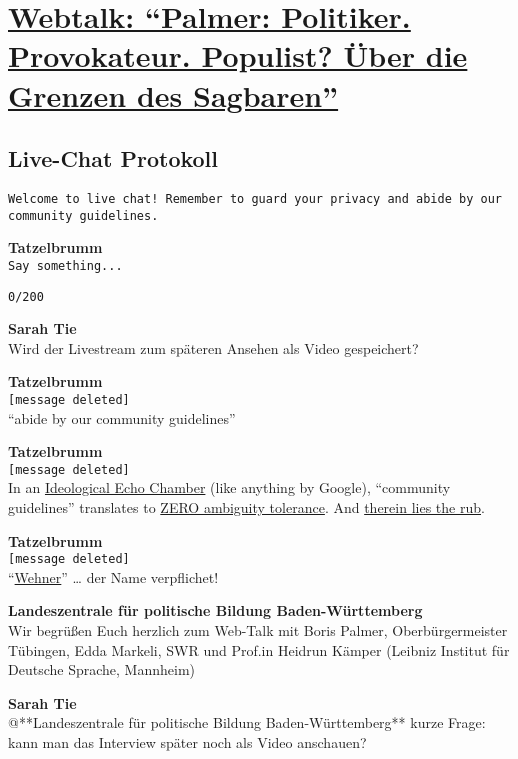\documentclass[]{article}
\date{}
\begin{document}
\section{\texorpdfstring{\protect\hyperlink{Webtalk}{Webtalk: ``Palmer:
Politiker. Provokateur. Populist? Über die Grenzen des
Sagbaren''}}{Webtalk: Palmer: Politiker. Provokateur. Populist? Über die Grenzen des Sagbaren}}\label{webtalk-palmer-politiker.-provokateur.-populist-uxfcber-die-grenzen-des-sagbaren}

\subsection{Live-Chat Protokoll}\label{live-chat-protokoll}

\texttt{Welcome\ to\ live\ chat!\ Remember\ to\ guard\ your\ privacy\ and\ abide\ by\ our\ community\ guidelines.}

\textbf{Tatzelbrumm}\\
\texttt{Say\ something...}

\texttt{0/200}

\textbf{Sarah Tie}\\
Wird der Livestream zum späteren Ansehen als Video gespeichert?

\textbf{Tatzelbrumm}\\
\texttt{{[}message\ deleted{]}}\\
``abide by our community guidelines''

\textbf{Tatzelbrumm}\\
\texttt{{[}message\ deleted{]}}\\
In an \protect\hyperlink{Ideological-Echo-Chamber}{Ideological Echo
Chamber} (like anything by Google), ``community guidelines'' translates
to \protect\hyperlink{ambiguity-tolerance}{ZERO ambiguity tolerance}.
And \protect\hyperlink{therein-lies-the-rub}{therein lies the rub}.

\textbf{Tatzelbrumm}\\
\texttt{{[}message\ deleted{]}}\\
``\protect\hyperlink{Wehner}{Wehner}'' \ldots{} der Name verpflichet!

\textbf{Landeszentrale für politische Bildung Baden-Württemberg}\\
Wir begrüßen Euch herzlich zum Web-Talk mit Boris Palmer,
Oberbürgermeister Tübingen, Edda Markeli, SWR und Prof.in Heidrun Kämper
(Leibniz Institut für Deutsche Sprache, Mannheim)

\textbf{Sarah Tie}\\
@**Landeszentrale für politische Bildung Baden-Württemberg** kurze
Frage: kann man das Interview später noch als Video anschauen?
\end{document}
